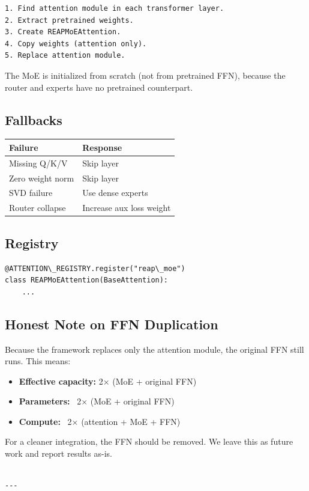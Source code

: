\begin{lstlisting}
1. Find attention module in each transformer layer.
2. Extract pretrained weights.
3. Create REAPMoEAttention.
4. Copy weights (attention only).
5. Replace attention module.
\end{lstlisting}

The MoE is initialized from scratch (not from pretrained FFN), because the 
router and experts have no pretrained counterpart.

\subsection{Fallbacks}

\begin{table}[H]
\centering
\small
\begin{tabular}{ll}
\toprule
\textbf{Failure} & \textbf{Response} \\
\midrule
Missing Q/K/V & Skip layer \\
Zero weight norm & Skip layer \\
SVD failure & Use dense experts \\
Router collapse & Increase aux loss weight \\
\bottomrule
\end{tabular}
\end{table}

\subsection{Registry}

\begin{lstlisting}
@ATTENTION\_REGISTRY.register("reap\_moe")
class REAPMoEAttention(BaseAttention):
    ...
\end{lstlisting}

\subsection{Honest Note on FFN Duplication}

Because the framework replaces only the attention module, the original FFN 
still runs. This means:

\begin{itemize}
\item \textbf{Effective capacity:} 2$\times$ (MoE + original FFN)
\item \textbf{Parameters:} ~2$\times$ (MoE + original FFN)
\item \textbf{Compute:} ~2$\times$ (attention + MoE + FFN)

\end{itemize}
For a cleaner integration, the FFN should be removed. We leave this as 
future work and report results as-is.
\begin{lstlisting}

---
\end{lstlisting}

